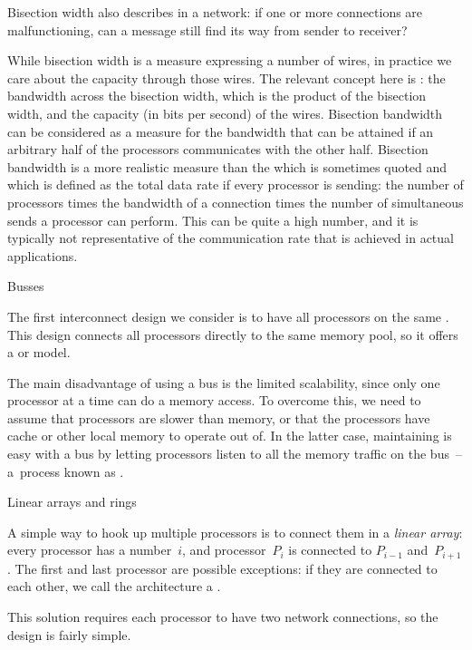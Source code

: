Bisection width also describes  in a network: if
one or more connections are malfunctioning, can a message
still find its way from sender to receiver?

While bisection width is a measure expressing a number of wires, in
practice we care about the capacity through those wires. The relevant
concept here is : the bandwidth across
the bisection width, which is the product of the bisection width, and
the capacity (in bits per second) of the wires.  
%
Bisection bandwidth
can be considered as a measure for the bandwidth that can be attained
if an arbitrary half of the processors communicates with the other
half.
Bisection bandwidth is a more realistic measure than the
 which is sometimes quoted
and which is defined
as the  total data rate if every processor is sending: the number of
processors times the bandwidth of a connection times the number of
simultaneous sends a processor can perform. This can be quite
a high number, and it is typically not representative of the
communication rate that is achieved in actual applications.

 {Busses}

The first interconnect design we consider is to have all processors
on the same . This design connects
all processors directly to the same memory pool, so it offers
a  or  model.

The main disadvantage of using a bus is the limited scalability,
since only one processor at a time can do a memory access. To overcome this,
we need to assume that processors are slower than memory,
or that the processors have cache or other local memory to operate out of.
In the latter case, maintaining 
is easy with a bus by letting processors listen to all the memory traffic
on the bus~-- a~process known as .

 {Linear arrays and rings}

A simple way to hook up multiple processors is to connect them in a
\emph{linear array}: every processor has a number~$i$, and
processor~$P_i$ is connected to $P_{i-1}$ and~$P_{i+1}$. The first and
last processor are possible exceptions: if they are connected to each
other, we call the architecture a .

This solution requires each processor to have two network connections,
so the design is fairly simple.

